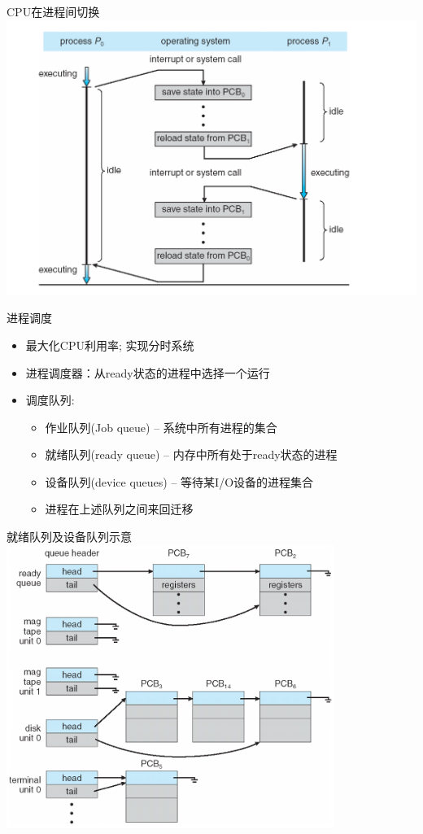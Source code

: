 \documentclass[xcolor=svgnames]{beamer}
\begin{document}
\begin{CJK*}{UTF8}{gbsn}
\begin{frame}{CPU在进程间切换}
\includegraphics[width=1.0\textwidth]{switch.png}
\end{frame}

\begin{frame}{进程调度}
\begin{itemize}
\item 最大化CPU利用率; 实现分时系统
\item 进程调度器：从ready状态的进程中选择一个运行
\item 调度队列:
\begin{itemize}
\item 作业队列(Job queue) -- 系统中所有进程的集合
\item 就绪队列(ready queue) -- 内存中所有处于ready状态的进程
\item 设备队列(device queues) -- 等待某I/O设备的进程集合
\item 进程在上述队列之间来回迁移
\end{itemize}
\end{itemize}
\end{frame}

\begin{frame}{就绪队列及设备队列示意}
\includegraphics[width=0.8\textwidth]{queues.png}
\end{frame}


\end{CJK*}
\end{document}
